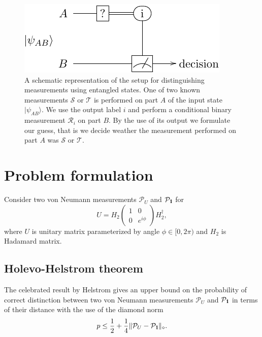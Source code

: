 \documentclass[11pt,a4paper,reqno, oneside]{amsart}
\newcommand{\ket}[1]{\ensuremath{|#1\rangle}}
\newcommand{\1}{{\rm 1\hspace{-0.9mm}l}}
\newcommand{\Id}{{\rm 1\hspace{-0.9mm}l}}
\newcommand{\TT}{\mathcal{T}}
\newcommand{\PP}{\mathcal{P}}
\begin{document}
\begin{figure}[h!]
	\centering 
	\includegraphics[width=0.9\linewidth]{gates1.pdf} 
	
	\caption{ A schematic representation of the setup for distinguishing
		measurements using entangled states. One of two known measurements $\mathcal{S}$
		or $\TT$ is performed on part $A$ of the input state $\ket{\psi_{AB}}$. We use
		the output label $i$ and perform a conditional binary measurement
		$\mathcal{R}_i$ on part $B$. By the use of its output we formulate our guess, 
		that is we decide  
		weather
		the measurement performed on part $A$ was $\mathcal{S}$ or $\TT$.
	}\label{fig:diamond}
\end{figure}



\newpage
\section{Problem formulation } 
Consider two von Neumann measurements $\PP_U$ and $\PP_{\Id}$ for  \begin{equation}
U = H_2 \left(\begin{array}{cc}1&0\\0&e^{i \phi}\end{array}\right)  H_2^\dagger,
\end{equation}
where
$U$ is unitary matrix parameterized by angle $\phi \in [0, 2\pi)$ and $H_2$ is Hadamard matrix. 

\subsection{Holevo-Helstrom theorem}
The celebrated result by Helstrom gives an upper
bound on the probability of correct distinction between two von Neumann measurements
$\PP_U$ and $\PP_{\Id}$ in terms of their distance with the use of the diamond norm
\begin{equation}
p \leq \frac12 + \frac14 \| \PP_U - \PP_{\Id} \|_\diamond.
\end{equation}
\end{document}
